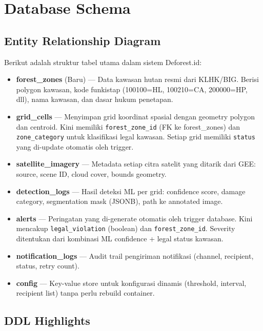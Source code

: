 \documentclass[11pt,a4paper]{article}
\begin{document}
\section{Database Schema}

\subsection{Entity Relationship Diagram}

Berikut adalah struktur tabel utama dalam sistem Deforest.id:

\begin{itemize}
    \item \textbf{forest\_zones} (Baru) --- Data kawasan hutan resmi dari KLHK/BIG. Berisi polygon kawasan, kode funkistap (100100=HL, 100210=CA, 200000=HP, dll), nama kawasan, dan dasar hukum penetapan.
    \item \textbf{grid\_cells} --- Menyimpan grid koordinat spasial dengan geometry polygon dan centroid. Kini memiliki \texttt{forest\_zone\_id} (FK ke forest\_zones) dan \texttt{zone\_category} untuk klasifikasi legal kawasan. Setiap grid memiliki \texttt{status} yang di-update otomatis oleh trigger.
    \item \textbf{satellite\_imagery} --- Metadata setiap citra satelit yang ditarik dari GEE: source, scene ID, cloud cover, bounds geometry.
    \item \textbf{detection\_logs} --- Hasil deteksi ML per grid: confidence score, damage category, segmentation mask (JSONB), path ke annotated image.
    \item \textbf{alerts} --- Peringatan yang di-generate otomatis oleh trigger database. Kini mencakup \texttt{legal\_violation} (boolean) dan \texttt{forest\_zone\_id}. Severity ditentukan dari kombinasi ML confidence + legal status kawasan.
    \item \textbf{notification\_logs} --- Audit trail pengiriman notifikasi (channel, recipient, status, retry count).
    \item \textbf{config} --- Key-value store untuk konfigurasi dinamis (threshold, interval, recipient list) tanpa perlu rebuild container.
\end{itemize}

\subsection{DDL Highlights}
\end{document}
